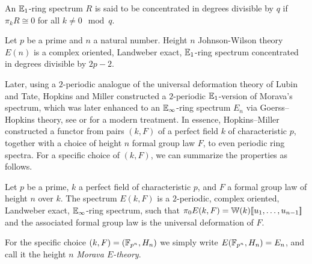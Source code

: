 \begin{definition}
    An $\mathbb{E}_1$-ring spectrum $R$ is said to be concentrated in degrees divisible by $q$ if $\pi_k R \cong 0$ for all $k \not = 0 \mod q$. 
\end{definition}

\begin{proposition}
    \label{prop:Johnson-Wilson-properties}
    Let $p$ be a prime and $n$ a natural number. Height $n$ Johnson-Wilson theory $E(n)$ is a complex oriented, Landweber exact, $\mathbb{E}_1$-ring spectrum concentrated in degrees divisible by $2p-2$. 
\end{proposition}

Later, using a $2$-periodic analogue of the universal deformation theory of Lubin and Tate, Hopkins and Miller constructed a $2$-periodic $\mathbb{E}_1$-version of Morava's spectrum, which was later enhanced to an $\mathbb{E}_\infty$-ring spectrum $E_n$ via Goerss--Hopkins theory, see \cite{goerss-hopkins_04} or \cite{pstragowski_vankoughnett_2022} for a modern treatment. In essence, Hopkins--Miller constructed a functor from pairs $(k, F)$ of a perfect field $k$ of characteristic $p$, together with a choice of height $n$ formal group law $F$, to even periodic ring spectra. For a specific choice of $(k, F)$, we can summarize the properties as follows.  

\begin{proposition}
    Let $p$ be a prime, $k$ a perfect field of characteristic $p$, and $F$ a formal group law of height $n$ over $k$. The spectrum $E(k,F)$ is a $2$-periodic, complex oriented, Landweber exact, $\mathbb{E}_\infty$-ring spectrum, such that $\pi_0 E(k,F)=\mathbb{W}(k)[\![ u_1, \ldots, u_{n-1}]\!]$ and the associated formal group law is the universal deformation of $F$. 
\end{proposition}




\begin{definition}
    For the specific choice $(k,F) = (\mathbb{F}_{p^n}, H_n)$ we simply write $E(\mathbb{F}_{p^n}, H_n) = E_n$, and call it the height $n$ \emph{Morava $E$-theory}. 
\end{definition}

